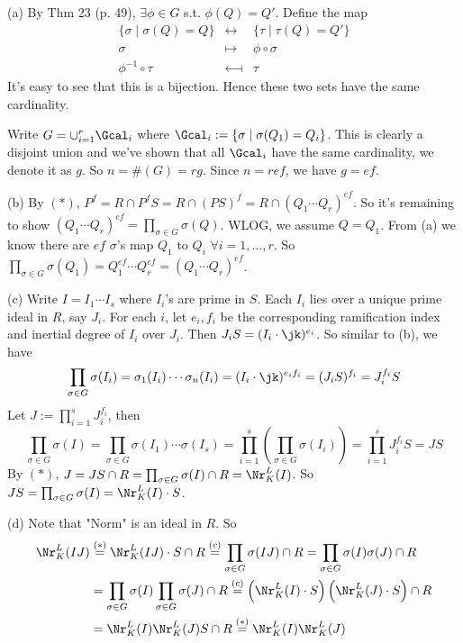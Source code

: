 \documentclass[../Chapter.tex]{subfiles}
\begin{document}
(a) By Thm 23 (p. 49), $\exists\phi\in G$ s.t. $\phi(Q)=Q'$. Define the map
$$
\begin{array}{ccc}
\{\sigma\mid \sigma(Q)=Q\} & \longleftrightarrow & \{\tau\mid \tau(Q)=Q'\} \\
\sigma & \longmapsto & \phi\circ\sigma \\
\phi^{-1}\circ\tau & \longmapsfrom & \tau
\end{array}
$$
It's easy to see that this is a bijection. Hence these two sets have the same cardinality.

Write $G=\cup_{i=1}^r \Gcal_i$ where $\Gcal_i:=\{\sigma\mid \sigma(Q_1)=Q_i\}$. This is clearly a disjoint union and we've shown that all $\Gcal_i$ have the same cardinality, we denote it as $g$. So $n=\#(G)=rg$. Since $n=ref$, we have $g=ef$.

(b) By $(*)$, $P^f=R\cap P^fS=R\cap(PS)^f=R\cap(Q_1\cdots Q_r)^{ef}$. So it's remaining to show $(Q_1\cdots Q_r)^{ef}=\prod_{\sigma\in G}\sigma(Q)$. WLOG, we assume $Q=Q_1$. From (a) we know there are $ef$ $\sigma$'s map $Q_1$ to $Q_i$ $\forall i=1,\ldots,r$. So $\prod_{\sigma\in G}\sigma(Q_1)=Q_1^{ef}\cdots Q_r^{ef}=(Q_1\cdots Q_r)^{ef}$.

(c) Write $I=I_1\cdots I_s$ where $I_i$'s are prime in $S$. Each $I_i$ lies over a unique prime ideal in $R$, say $J_i$. For each $i$, let $e_i,f_i$ be the corresponding ramification index and inertial degree of $I_i$ over $J_i$. Then $J_iS=(I_i\cdot\jk)^{e_i}$. So similar to (b), we have $$\prod_{\sigma\in G}\sigma(I_i)=\sigma_1(I_i)\cdots\sigma_n(I_i)=(I_i\cdot\jk)^{e_if_i}=(J_iS)^{f_i}=J_i^{f_i}S$$ Let $J:=\prod_{i=1}^s J_i^{f_i}$, then $$\prod_{\sigma\in G}\sigma(I)=\prod_{\sigma\in G}\sigma(I_1)\cdots\sigma(I_s)=\prod_{i=1}^s\left(\prod_{\sigma\in G}\sigma(I_i)\right)=\prod_{i=1}^s J_i^{f_i}S=JS$$ By $(*)$, $J=JS\cap R=\prod_{\sigma\in G}\sigma(I)\cap R=\Nr^L_K(I)$. So $JS=\prod_{\sigma\in G}\sigma(I)=\Nr^L_K(I)\cdot S$.

(d) Note that "Norm" is an ideal in $R$. So
\begin{align*}
\Nr^L_K(IJ) &\overset{(*)}{=} \Nr^L_K(IJ)\cdot S\cap R \overset{(c)}{=} \prod_{\sigma\in G}\sigma(IJ)\cap R = \prod_{\sigma\in G}\sigma(I)\sigma(J)\cap R \\
&= \prod_{\sigma\in G}\sigma(I)\prod_{\sigma\in G}\sigma(J)\cap R \overset{(c)}{=} \left(\Nr^L_K(I)\cdot S\right)\left(\Nr^L_K(J)\cdot S\right)\cap R \\
&= \Nr^L_K(I)\Nr^L_K(J)S\cap R \overset{(*)}{=} \Nr^L_K(I)\Nr^L_K(J)
\end{align*}
\end{document}
